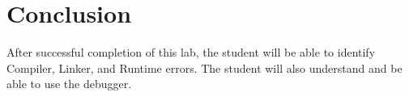 \section{Conclusion}

After successful completion of this lab, the student will be able to identify Compiler, Linker, and Runtime errors. The student will also understand and be able to use the debugger.
